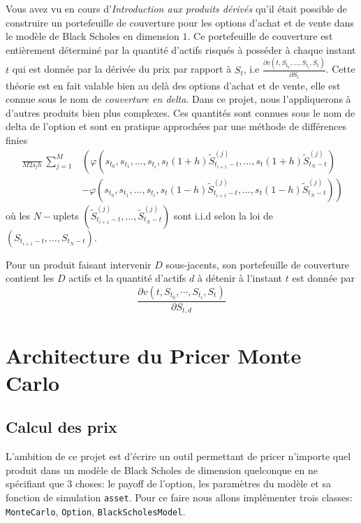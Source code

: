 \documentclass[a4paper,11pt]{article}
\def\expp#1{\mathop {\mathrm{e}^{ #1}}}
\begin{document}
Vous avez vu en cours d'{\it Introduction aux produits dérivés} qu'il était possible de construire un portefeuille de couverture pour les options d'achat et de vente dans le modèle de Black Scholes en dimension $1$. Ce portefeuille de couverture est entièrement déterminé par la quantité d'actifs risqués à posséder à chaque instant $t$ qui est donnée par la dérivée du prix par rapport à $S_t$, i.e $\frac{\partial v(t, S_{t_0}, \dots, S_{t_i}, S_{t})}{\partial S_t}$.  Cette théorie est en fait valable bien au delà des options d'achat et de vente, elle est connue sous le nom de {\it couverture en delta}. Dans ce projet, nous l'appliquerons à d'autres produits bien plus complexes.  Ces quantités sont connues sous le nom de delta de l'option et sont en pratique approchées par une méthode de différences finies
\begin{align}
  \label{delta_t}
  \frac{\expp{-r (T - t)}}{M  2 s_t h} \sum_{j=1}^M & \left( \varphi(s_{t_0}, s_{t_1}, \dots,
  s_{t_i}, s_t(1+h) \tilde S_{t_{i+1} - t}^{(j)}, \dots,  s_t(1+h) \tilde S_{t_N -
  t}^{(j)}) \right. \nonumber \\
  & \left. - \varphi(s_{t_0}, s_{t_1}, \dots,
  s_{t_i}, s_t(1-h) \tilde S_{t_{i+1} - t}^{(j)}, \dots,  s_t (1-h) \tilde
  S_{t_N - t}^{(j)}) \right)
\end{align}
où les $N-$uplets $(\tilde S_{t_{i+1} - t}^{(j)}, \dots, \tilde S_{t_N - t}^{(j)})$ sont i.i.d selon la loi de $(S_{t_{i+1} - t}, \dots, S_{t_N - t})$.

Pour un produit faisant intervenir $D$ sous-jacents, son portefeuille de couverture contient les $D$ actifs et la quantité d'actifs $d$ à détenir à l'instant $t$ est donnée par
\begin{equation*}
  \frac{\partial v(t, S_{t_0}, \cdots, S_{t_i}, S_{t})}{\partial S_{t,d}}
\end{equation*}

\section{Architecture du Pricer Monte Carlo}
\label{sec:archi}
\subsection{Calcul des prix}


L'ambition de ce projet est d'écrire un outil permettant de pricer n'importe quel produit dans un modèle de Black Scholes de dimension quelconque en ne spécifiant que 3 choses: le payoff de l'option, les paramètres du modèle et sa fonction de simulation \texttt{asset}. Pour ce faire nous allons implémenter trois classes: \verb!MonteCarlo!, \verb!Option!, \verb!BlackScholesModel!.
\end{document}
